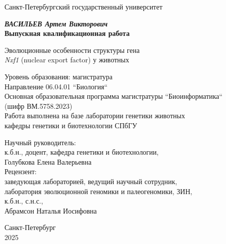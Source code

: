 \newpage
\begin{titlepage}

\begin{center}
    Санкт-Петербургский государственный университет
    \vspace{3cm}

    \textit{\textbf{ВАСИЛЬЕВ Артем Викторович}} \\
    \vspace{0.5cm}
    \textbf{Выпускная квалификационная работа}
    \vspace{0.5cm}

    Эволюционные особенности структуры гена \\\textit{Nxf1} (nuclear export factor) у животных
\end{center}

\vfill

\begin{center}
    Уровень образования: магистратура \\Направление 06.04.01 ``Биология`` \\Основная образовательная программа магистратуры ``Биоинформатика`` \\(шифр ВМ.5758.2023) \\
    \vspace{0.5cm}
    Работа выполнена на базе лаборатории генетики животных \\кафедры генетики и биотехнологии СПбГУ
\end{center}

\vfill

\begin{flushright}
    Научный руководитель: \\к.б.н., доцент, кафедра генетики и биотехнологии, \\Голубкова Елена Валерьевна \\
    \vspace{1cm}
    Рецензент: \\заведующая лабораторией, ведущий научный сотрудник, \\лаборатория эволюционной геномики и палеогеномики, ЗИН, \\к.б.н., с.н.с., \\Абрамсон Наталья Иосифовна
\end{flushright}

\vfill

\begin{center}
    Санкт-Петербург \\2025
\end{center}

\end{titlepage}

\setcounter{page}{2} %
